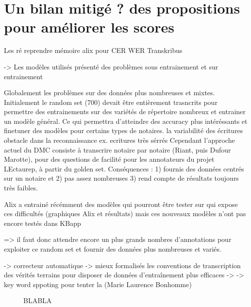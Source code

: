 \section{Un bilan mitigé ? des propositions pour améliorer les scores}

Les ré
reprendre mémoire alix pour CER WER Transkribus

-> Les modèles utilisés présenté des problèmes sous entrainement et sur entrainement



Globalement les problèmes sur des données plus nombreuses et mixtes. Initialement le random set (700) devait être entièrement trasncrits 
pour permettre des entrainements sur des variétés de répertoire nombreux et entrainer un modèle général. Ce qui permettra d'atteindre des accuracy plus intéréssants et finetuner des modèles pour certains types de notaires. 
la variabilité des écritures obstacle dans la reconnaissance ex. ecritures très sérrés
Cependant l'approche actuel du DMC consiste à transcrire notaire par notaire (Riant, puis Dufour Marotte), pour des questions de facilité pour les annotateurs du projet LEctaurep, à partir du golden set. Conséquences : 1) fournis des données centrés sur un notaire et 2) pas assez nombreuses 3) rend compte de résultats toujours très faibles. 

Alix a entrainé récémment des modèles qui pourront être tester sur qui expose ces difficultés (graphiques Alix et résultats) mais ces nouveaux modèles n'ont pas encore testés dans KBapp

=> il faut donc attendre encore un plus grands nombres d'annotations pour exploiter ce random set et fournir des données plus nombreuses et variés. 



-> correcteur automatique
-> mieux formalisés les conventions de transcription des vérités terrains pour disposer de données d'entraînement plus efficaces
-> 
-> key word sppoting pour tenter la (Marie Laurence Bonhomme)


\begin{figure}[h] %
    \begin{minipage}[c]{.46\linewidth} %
        \centering
    \end{minipage}
    \hfill%
    \begin{minipage}[c]{.46\linewidth}
        \centering
    \end{minipage}
    \hfill%
        \begin{minipage}[c]{.46\linewidth}
        \centering
    \end{minipage}
    \hfill%
        \begin{minipage}[c]{.46\linewidth}
        \centering
    \end{minipage}
    \caption{BLABLA} %
\end{figure}
